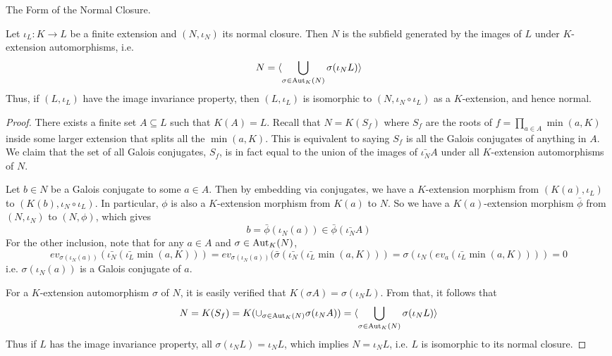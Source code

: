 \documentclass[../book.tex]{subfiles}
\begin{document}
\begin{thm} The Form of the Normal Closure.
    
    Let $\iota_L : K \to L$ be a finite extension 
    and $(N,\iota_N)$ its normal closure.
    Then $N$ is the subfield generated by 
    the images of $L$ under $K$-extension automorphisms,
    i.e. \[
        N = \langle\bigcup_{\sigma \in \text{Aut}_{K}(N)} \sigma(\iota_N L)\rangle
    \]
    Thus, if $(L,\iota_L)$ have the image invariance property,
    then $(L,\iota_L)$ is isomorphic to $(N,\iota_N\circ\iota_L)$ as a $K$-extension,
    and hence normal. 
\end{thm}
\begin{proof}
    There exists a finite set $A\subseteq L$ such that $K(A) = L$.
    Recall that $N = K(S_f)$ where $S_f$ are the roots of 
    $f = \prod_{a \in A} \min(a,K)$ inside some larger extension 
    that splits all the $\min(a,K)$. 
    This is equivalent to saying $S_f$ is all the Galois conjugates
    of anything in $A$. 
    We claim that the set of all Galois conjugates, $S_f$,
    is in fact equal to the union of 
    the images of $\bar{\iota_N} A$ under all $K$-extension automorphisms of $N$. 
    
    Let $b \in N$ be a Galois conjugate to some $a \in A$. 
    Then by embedding via conjugates, we have a $K$-extension morphism
    from $(K(a),\iota_L)$ to $(K(b),\iota_N\circ\iota_L)$. 
    In particular, $\phi$ is also a $K$-extension morphism from $K(a)$ to $N$.
    So we have a $K(a)$-extension morphism $\bar{\phi}$ 
    from $(N,\iota_N)$ to $(N,\phi)$, which gives \[
        b = \bar{\phi}(\iota_N(a)) \in \bar{\phi} (\bar{\iota_N} A)
    \]
    For the other inclusion, note that for any $a \in A$ and $\sigma \in \text{Aut}_{K}(N)$,
    \[
        ev_{\sigma(\iota_N(a))}(\bar{\iota_N}(\bar{\iota_L}\min(a,K)))
        = ev_{\sigma(\iota_N(a))}
        (\bar{\sigma}(\bar{\iota_N}(\bar{\iota_L}\min(a,K)))
        = \sigma(\iota_N( ev_a (\bar{\iota_L}\min(a,K)) ))
        = 0
    \]
    i.e. $\sigma(\iota_N(a))$ is a Galois conjugate of $a$. 
    
    For a $K$-extension automorphism $\sigma$ of $N$, 
    it is easily verified that $K(\sigma A) = \sigma(\iota_N L)$.
    From that, it follows that
    \[
        N = K(S_f) = K(\cup_{\sigma\in\text{Aut}_{K}(N)} \sigma(\iota_N A))
        = \langle\bigcup_{\sigma \in \text{Aut}_{K}(N)} \sigma(\iota_N L)\rangle
    \]
    Thus if $L$ has the image invariance property, 
    all $\sigma(\iota_N L) = \iota_N L$, 
    which implies $N = \iota_N L$, 
    i.e. $L$ is isomorphic to its normal closure.
    
\end{proof}
\end{document}
